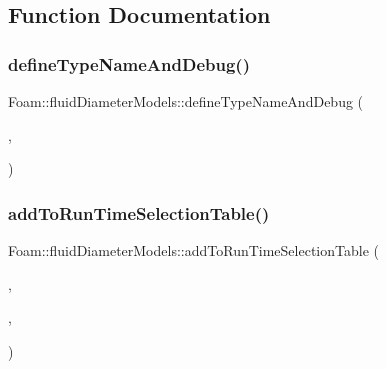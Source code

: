 \subsection{Function Documentation}
\mbox{\label{namespaceFoam_1_1fluidDiameterModels_abc82f417c5655214c01ff6904c56f223}} 
\subsubsection{\texorpdfstring{define\+Type\+Name\+And\+Debug()}{defineTypeNameAndDebug()}\hspace{0.1cm}{\footnotesize\ttfamily [1/4]}}
{\footnotesize\ttfamily Foam\+::fluid\+Diameter\+Models\+::define\+Type\+Name\+And\+Debug (\begin{DoxyParamCaption}\item[{\hyperlink{classFoam_1_1fluidDiameterModels_1_1isomolarBubble}{isomolar\+Bubble}}]{,  }\item[{0}]{ }\end{DoxyParamCaption})}

\mbox{\label{namespaceFoam_1_1fluidDiameterModels_a4e598d547c7d5849e6b431705e676818}} 
\subsubsection{\texorpdfstring{add\+To\+Run\+Time\+Selection\+Table()}{addToRunTimeSelectionTable()}\hspace{0.1cm}{\footnotesize\ttfamily [1/4]}}
{\footnotesize\ttfamily Foam\+::fluid\+Diameter\+Models\+::add\+To\+Run\+Time\+Selection\+Table (\begin{DoxyParamCaption}\item[{\hyperlink{classFoam_1_1fluidDiameterModel}{fluid\+Diameter\+Model}}]{,  }\item[{\hyperlink{classFoam_1_1fluidDiameterModels_1_1isomolarBubble}{isomolar\+Bubble}}]{,  }\item[{fluid\+Diameter\+Models}]{ }\end{DoxyParamCaption})}

